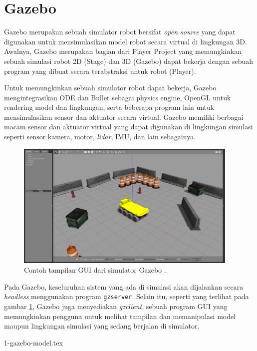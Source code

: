 \section{Gazebo}
\label{sec:gazebo}

Gazebo \citep{cit:koenig2004} merupakan sebuah simulator robot bersifat \emph{open source} yang dapat digunakan untuk mensimulasikan model robot secara virtual di lingkungan 3D.
Awalnya, Gazebo merupakan bagian dari Player Project \citep{cit:gerkey2003} yang memungkinkan sebuah simulasi robot 2D (Stage) dan 3D (Gazebo) dapat bekerja dengan sebuah program yang dibuat secara terabstraksi untuk robot (Player).

Untuk memungkinkan sebuah simulator robot dapat bekerja,
  Gazebo mengintegrasikan ODE dan Bullet sebagai physics engine,
  OpenGL untuk rendering model dan lingkungan,
  serta beberapa program lain untuk mensimulasikan sensor dan aktuator secara virtual.
Gazebo memiliki berbagai macam sensor dan aktuator virtual yang dapat digunakan di lingkungan simulasi seperti sensor kamera, motor, \emph{lidar}, IMU, dan lain sebagainya.

\begin{figure}[ht]
  \centering
  \includegraphics[width=0.95\textwidth,keepaspectratio]{gambar/contoh-gui-gazebo.png}
  \caption{Contoh tampilan GUI dari simulator Gazebo \citep{url:gazeboexample}.}
  \label{fig:contohguigazebo}
\end{figure}

Pada Gazebo, keseluruhan sistem yang ada di simulasi akan dijalankan secara \emph{headless} menggunakan program \lstinline{gzserver}.
Selain itu, seperti yang terlihat pada gambar \ref{fig:contohguigazebo},
  Gazebo juga menyediakan \emph{gzclient}, sebuah program GUI yang memungkinkan pengguna untuk melihat tampilan dan memanipulasi model maupun lingkungan simulasi yang sedang berjalan di simulator.

{1-gazebo-model.tex}
